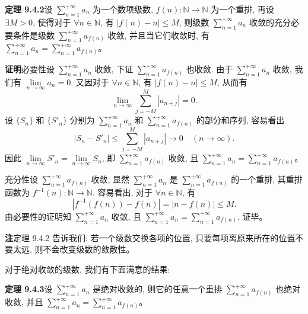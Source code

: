 \documentclass[UTF8, 12pt, fontset=fandol, oneside]{ctexart}
\begin{document}
\noindent\textbf{定理 9.4.2}\quad 设 $\sum\limits_{n=1}^{+\infty}a_n$ 为一个数项级数, $f(n):\mathbb{N}\to\mathbb{N}$ 为一个重排, 再设 $\exists M>0$, 使得对于 $\forall n\in\mathbb{N}$, 有 $|f(n)-n|\leq M$, 则级数 $\sum\limits_{n=1}^{+\infty}a_n$ 收敛的充分必要条件是级数 $\sum\limits_{n=1}^{+\infty}a_{f(n)}$ 收敛, 并且当它们收敛时, 有 $\sum\limits_{n=1}^{+\infty}a_n=\sum\limits_{n=1}^{+\infty}a_{f(n)}$。

\noindent\textbf{证明}\quad 必要性\quad 设 $\sum\limits_{n=1}^{+\infty}a_n$ 收敛, 下证 $\sum\limits_{n=1}^{+\infty}a_{f(n)}$ 也收敛. 由于 $\sum\limits_{n=1}^{+\infty}a_n$ 收敛, 我们有 $\lim\limits_{n\to\infty}a_n=0$. 又因对于 $\forall n\in\mathbb{N}$, 有 $|f(n)-n|\leq M$, 从而有
\[
  \lim_{n\to\infty}\sum_{j=-M}^{M}|a_{n+j}|=0.
\]
设 $\{S_n\}$ 和 $\{S'_n\}$ 分别为 $\sum\limits_{n=1}^{+\infty}a_n$ 和 $\sum\limits_{n=1}^{+\infty}a_{f(n)}$ 的部分和序列, 容易看出
\[
  |S_n-S'_n|\leq\sum_{j=-M}^{M}|a_{n+j}|\to0\quad(n\to\infty).
\]
因此 $\lim\limits_{n\to\infty}S'_n=\lim\limits_{n\to\infty}S_n$, 即 $\sum\limits_{n=1}^{+\infty}a_{f(n)}$ 收敛, 且 $\sum\limits_{n=1}^{+\infty}a_n=\sum\limits_{n=1}^{+\infty}a_{f(n)}$。

充分性\quad 设 $\sum\limits_{n=1}^{+\infty}a_{f(n)}$ 收敛, 显然 $\sum\limits_{n=1}^{+\infty}a_n$ 是 $\sum\limits_{n=1}^{+\infty}a_{f(n)}$ 的一个重排, 其重排函数为 $f^{-1}(n):\mathbb{N}\to\mathbb{N}$. 容易看出, 对于 $\forall n\in\mathbb{N}$, 有
\[
  |f^{-1}(f(n))-f(n)|=|n-f(n)|\leq M.
\]
由必要性的证明知 $\sum\limits_{n=1}^{+\infty}a_n$ 收敛, 且 $\sum\limits_{n=1}^{+\infty}a_n=\sum\limits_{n=1}^{+\infty}a_{f(n)}$. 证毕。

\noindent\textbf{注}\quad 定理 9.4.2 告诉我们: 若一个级数交换各项的位置, 只要每项离原来所在的位置不要太远, 则不会改变级数的敛散性。

对于绝对收敛的级数, 我们有下面满意的结果:

\noindent\textbf{定理 9.4.3}\quad 设 $\sum\limits_{n=1}^{+\infty}a_n$ 是绝对收敛的, 则它的任意一个重排 $\sum\limits_{n=1}^{+\infty}a_{f(n)}$ 也绝对收敛, 并且 $\sum\limits_{n=1}^{+\infty}a_n=\sum\limits_{n=1}^{+\infty}a_{f(n)}$。
\end{document}
